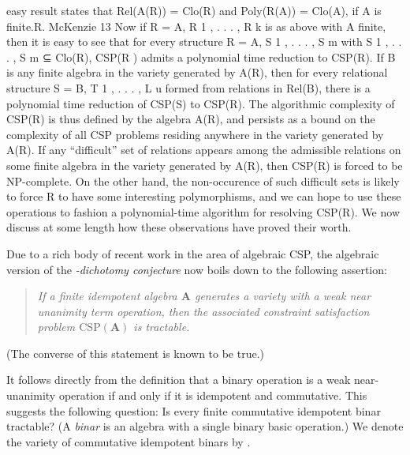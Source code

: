 \begin{thebibliography}{1}
easy result states that
Rel(A(R)) = Clo(R) and Poly(R(A)) = Clo(A), if A is finite.R. McKenzie
13
Now if R = A, R 1 , . . . , R k is as above with A finite, then it is easy to see that for every structure R =
A, S 1 , . . . , S m with {S 1 , . . . , S m } ⊆ Clo(R), CSP(R ) admits a polynomial time reduction to CSP(R).
If B is any finite algebra in the variety generated by A(R), then for every relational structure S =
B, T 1 , . . . , L u formed from relations in Rel(B), there is a polynomial time reduction of CSP(S) to CSP(R).
The algorithmic complexity of CSP(R) is thus defined by the algebra A(R), and persists as a bound on
the complexity of all CSP problems residing anywhere in the variety generated by A(R). If any “difficult”
set of relations appears among the admissible relations on some finite algebra in the variety generated by
A(R), then CSP(R) is forced to be NP-complete. On the other hand, the non-occurence of such difficult
sets is likely to force R to have some interesting polymorphisms, and we can hope to use these operations
to fashion a polynomial-time algorithm for resolving CSP(R). We now discuss at some length how these
observations have proved their worth.


































Due to a rich body of recent work in the area of algebraic CSP, the algebraic
version of the \emph{\csp-dichotomy conjecture} now boils down to 
the following assertion:
\begin{quote}
\emph{If a finite idempotent algebra $\mathbf{A}$ generates a variety with a weak near
unanimity term operation, then the associated constraint satisfaction problem 
$\mathrm{CSP}(\mathbf{A})$ is tractable.}
\end{quote}
(The converse of this statement is known to be true.)

It follows directly from the definition that a binary operation is a weak
near-unanimity operation if and only if it is idempotent and commutative. This
suggests the following question: Is every finite commutative idempotent binar
tractable? (A \emph{binar} is an algebra with a single binary basic operation.)
We denote the variety of commutative idempotent binars by \cib. 


\end{thebibliography}
